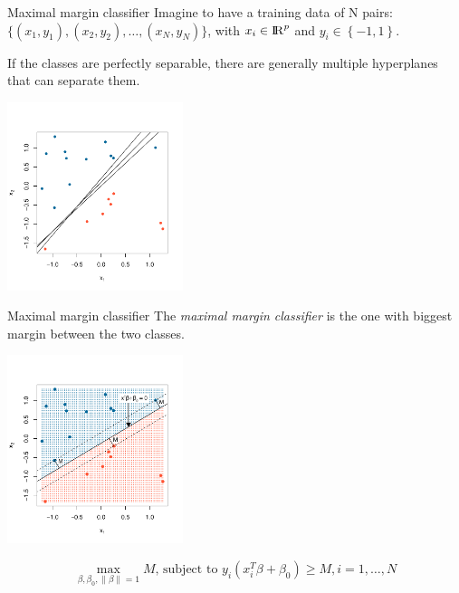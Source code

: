 \documentclass[notes]{beamer}          %
\newcommand{\norm}[1]{\left\lVert#1\right\rVert}
\providecommand{\norm}[1]{\lVert#1\rVert}
\begin{document}
\begin{frame}{Maximal margin classifier}
Imagine to have a training data of N pairs: $\{(x_1, y_1), (x_2, y_2), \dots, (x_N, y_N)\}$, with $x_i \in {\rm I\!R}^p$ and $y_i \in \left\{-1,1 \right\}$.

If the classes are perfectly separable, there are generally multiple hyperplanes that can separate them.

\begin{center}
\includegraphics[height=5.5cm]{../figures/week_2_classification/svm_hyperplanes.pdf}
\end{center}

\end{frame}


\begin{frame}{Maximal margin classifier}
The \textit{maximal margin classifier} is the one with biggest margin between the two classes.

\begin{center}
\includegraphics[height=5.5cm]{../figures/week_2_classification/svm_maximal_margin_classifier.pdf}
\end{center}

\vspace{-7mm} 

\begin{equation*}
\max_{\beta, \beta_0, \norm{\beta} = 1} M \text{, subject to } y_i(x^T_i \beta + \beta_0) \geq M, i=1, \dots, N
\end{equation*}

\end{frame}
\end{document}

